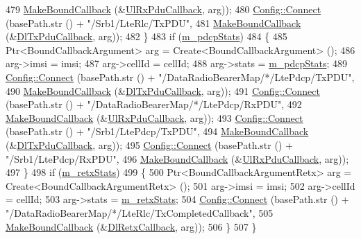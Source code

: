 \begin{DoxyCode}
479                        \hyperlink{group__makeboundcallback_ga1725d6362e6065faa0709f7c93f8d770}{MakeBoundCallback} (&\hyperlink{namespacens3_a269527c03607c9c885d7cff7667ec5e0}{UlRxPduCallback}, arg));
480       \hyperlink{group__config_ga4014f151241cd0939b6cb64409605736}{Config::Connect} (basePath.str () + \textcolor{stringliteral}{"/Srb1/LteRlc/TxPDU"},
481                        \hyperlink{group__makeboundcallback_ga1725d6362e6065faa0709f7c93f8d770}{MakeBoundCallback} (&\hyperlink{namespacens3_a7de82f7ed9986b9bcb67951f61e02ff4}{DlTxPduCallback}, arg));
482     \}
483   \textcolor{keywordflow}{if} (\hyperlink{classns3_1_1RadioBearerStatsConnector_a984690769317e9eddba15e49170f10d9}{m\_pdcpStats})
484     \{
485       Ptr<BoundCallbackArgument> arg = Create<BoundCallbackArgument> ();
486       arg->imsi = imsi;
487       arg->cellId = cellId; 
488       arg->stats = \hyperlink{classns3_1_1RadioBearerStatsConnector_a984690769317e9eddba15e49170f10d9}{m\_pdcpStats};
489       \hyperlink{group__config_ga4014f151241cd0939b6cb64409605736}{Config::Connect} (basePath.str () + \textcolor{stringliteral}{"/DataRadioBearerMap/*/LtePdcp/TxPDU"},
490                        \hyperlink{group__makeboundcallback_ga1725d6362e6065faa0709f7c93f8d770}{MakeBoundCallback} (&\hyperlink{namespacens3_a7de82f7ed9986b9bcb67951f61e02ff4}{DlTxPduCallback}, arg));
491       \hyperlink{group__config_ga4014f151241cd0939b6cb64409605736}{Config::Connect} (basePath.str () + \textcolor{stringliteral}{"/DataRadioBearerMap/*/LtePdcp/RxPDU"},
492                        \hyperlink{group__makeboundcallback_ga1725d6362e6065faa0709f7c93f8d770}{MakeBoundCallback} (&\hyperlink{namespacens3_a269527c03607c9c885d7cff7667ec5e0}{UlRxPduCallback}, arg));
493       \hyperlink{group__config_ga4014f151241cd0939b6cb64409605736}{Config::Connect} (basePath.str () + \textcolor{stringliteral}{"/Srb1/LtePdcp/TxPDU"},
494                        \hyperlink{group__makeboundcallback_ga1725d6362e6065faa0709f7c93f8d770}{MakeBoundCallback} (&\hyperlink{namespacens3_a7de82f7ed9986b9bcb67951f61e02ff4}{DlTxPduCallback}, arg));
495       \hyperlink{group__config_ga4014f151241cd0939b6cb64409605736}{Config::Connect} (basePath.str () + \textcolor{stringliteral}{"/Srb1/LtePdcp/RxPDU"},
496                        \hyperlink{group__makeboundcallback_ga1725d6362e6065faa0709f7c93f8d770}{MakeBoundCallback} (&\hyperlink{namespacens3_a269527c03607c9c885d7cff7667ec5e0}{UlRxPduCallback}, arg));
497     \}
498   \textcolor{keywordflow}{if} (\hyperlink{classns3_1_1RadioBearerStatsConnector_ad6d3ef18f579f2da0e2bee4f1850e205}{m\_retxStats}) 
499     \{
500       Ptr<BoundCallbackArgumentRetx> arg = Create<BoundCallbackArgumentRetx> ();
501       arg->imsi = imsi;
502       arg->cellId = cellId; 
503       arg->stats = \hyperlink{classns3_1_1RadioBearerStatsConnector_ad6d3ef18f579f2da0e2bee4f1850e205}{m\_retxStats};
504       \hyperlink{group__config_ga4014f151241cd0939b6cb64409605736}{Config::Connect} (basePath.str () + \textcolor{stringliteral}{"/DataRadioBearerMap/*/LteRlc/TxCompletedCallback"},
505          \hyperlink{group__makeboundcallback_ga1725d6362e6065faa0709f7c93f8d770}{MakeBoundCallback} (&\hyperlink{namespacens3_a5778b5cac8d73d89a93bab0e1b460ed5}{DlRetxCallback}, arg));
506     \}
507 \}
\end{DoxyCode}


